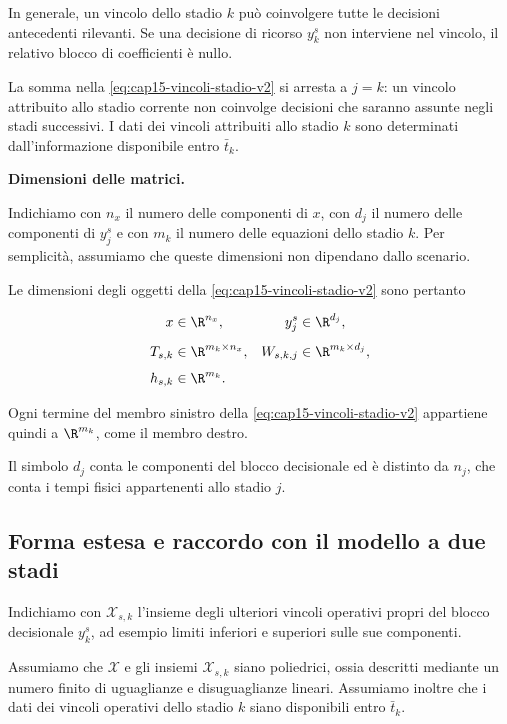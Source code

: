 In generale,
un vincolo dello stadio $k$
pu\`o coinvolgere tutte
le decisioni antecedenti
rilevanti. Se una decisione di ricorso $y_k^s$
non interviene nel vincolo,
il relativo blocco di
coefficienti \`e nullo.

La somma nella
\eqref{eq:cap15-vincoli-stadio-v2}
si arresta a $j=k$:
un vincolo attribuito allo
stadio corrente non coinvolge
decisioni che saranno assunte
negli stadi successivi.
I dati dei vincoli attribuiti
allo stadio $k$ sono determinati
dall'informazione disponibile
entro $\bar t_k$.

\medskip

\noindent
\textbf{Dimensioni delle matrici.}

Indichiamo con $n_x$ il numero
delle componenti di $x$,
con $d_j$ il numero delle
componenti di $y_j^s$ e
con $m_k$ il numero delle
equazioni dello stadio $k$.
Per semplicit\`a, assumiamo
che queste dimensioni non
dipendano dallo scenario.

Le dimensioni degli oggetti
della \eqref{eq:cap15-vincoli-stadio-v2}
sono pertanto

\[
\begin{aligned}
x&\in\R^{n_x},
&
y_j^s&\in\R^{d_j},
\\[4pt]
T_{s,k}&\in\R^{m_k\times n_x},
&
W_{s,k,j}&\in\R^{m_k\times d_j},
\\[4pt]
h_{s,k}&\in\R^{m_k}.
\end{aligned}
\]

Ogni termine del membro sinistro
della \eqref{eq:cap15-vincoli-stadio-v2}
appartiene quindi a $\R^{m_k}$,
come il membro destro.

Il simbolo $d_j$ conta le
componenti del blocco decisionale
ed \`e distinto da $n_j$,
che conta i tempi fisici
appartenenti allo stadio $j$.


\subsection{Forma estesa e raccordo
con il modello a due stadi}

Indichiamo con $\mathcal X_{s,k}$
l'insieme degli ulteriori vincoli
operativi propri del blocco
decisionale $y_k^s$, ad esempio
limiti inferiori e superiori
sulle sue componenti.

Assumiamo che $\mathcal X$
e gli insiemi $\mathcal X_{s,k}$
siano poliedrici, ossia descritti
mediante un numero finito di
uguaglianze e disuguaglianze
lineari. Assumiamo inoltre
che i dati dei vincoli operativi
dello stadio $k$ siano disponibili
entro $\bar t_k$.

